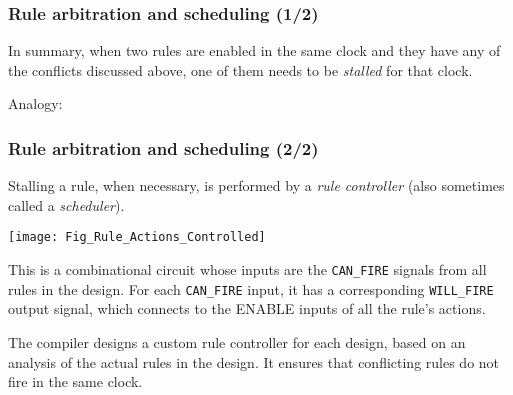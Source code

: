 
\begin{frame}[fragile]
\frametitle{Rule arbitration and scheduling (1/2)}

\footnotesize

In summary, when two rules are enabled in the same clock and they have
any of the conflicts discussed above, one of them needs to
be \emph{stalled} for that clock.

\vspace{5ex}

Analogy:

\end{frame}


\begin{frame}[fragile]
\frametitle{Rule arbitration and scheduling (2/2)}

\footnotesize

Stalling a rule, when necessary, is performed by a \emph{rule
controller} (also sometimes called a \emph{scheduler}).

\begin{center}
 \texttt{[image: Fig\_Rule\_Actions\_Controlled]}
\end{center}

This is a combinational circuit whose inputs are the {\tt CAN\_FIRE}
signals from all rules in the design.  For each {\tt CAN\_FIRE} input,
it has a corresponding {\tt WILL\_FIRE} output signal, which connects
to the ENABLE inputs of all the rule's actions.

\vspace{1ex}

The {\bsc} compiler designs a custom rule controller for each design,
based on an analysis of the actual rules in the design.  It ensures
that conflicting rules do not fire in the same clock.

\end{frame}

